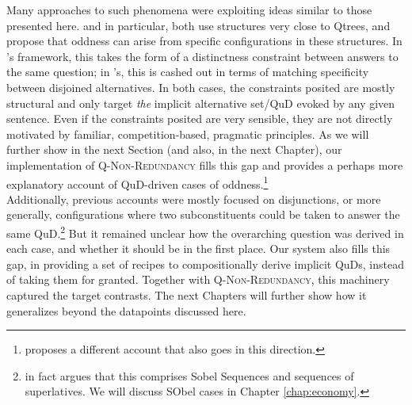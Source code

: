 \begin{exe}
	\begin{xlist}
	\end{xlist}
\end{exe}

Many approaches to such phenomena were exploiting ideas similar to those presented here. \citet{Ippolito2019} and \citet{Zhang2022} in particular, both use structures very close to Qtrees, and propose that oddness can arise from specific configurations in these structures. In \citeauthor{Zhang2022}'s framework, this takes the form of a distinctness constraint between answers to the same question; in \citeauthor{Ippolito2019}'s, this is cashed out in terms of matching specificity between disjoined alternatives. In both cases, the constraints posited are mostly structural and only target \textit{the} implicit alternative set/QuD evoked by any given sentence. Even if the constraints posited are very sensible, they are not directly motivated by familiar, competition-based, pragmatic principles. As we will further show in the next Section (and also, in the next Chapter), our implementation of \textsc{Q-Non-Redundancy} fills this gap and provides a perhaps more explanatory account of QuD-driven cases of oddness.\footnote{ proposes a different account that also goes in this direction.}\\


Additionally, previous accounts were mostly focused on disjunctions, or more generally, configurations where two subconstituents could be taken to answer the same QuD.\footnote{\citet{Ippolito2019} in fact argues that this comprises Sobel Sequences and sequences of superlatives. We will discuss SObel cases in Chapter \ref{chap:economy}.} But it remained unclear how the overarching question was derived in each case, and whether it should be in the first place. Our system also fills this gap, in providing a set of recipes to compositionally derive implicit QuDs, instead of taking them for granted. Together with \textsc{Q-Non-Redundancy}, this machinery captured the target contrasts. The next Chapters will further show how it generalizes beyond the datapoints discussed here.\\

